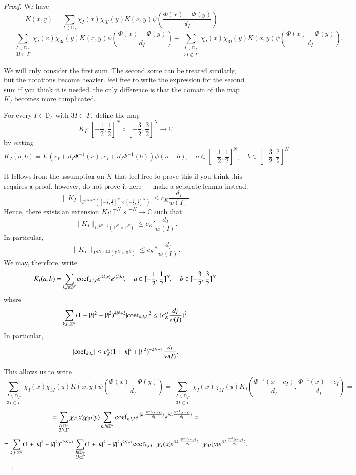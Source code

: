 \documentclass[12pt]{amsart}
\begin{document}
\begin{proof} We have
$$K(x,y)=\sum_{I\in\mathbb{D}_{\Gamma}}\chi_I(x)\chi_{3I}(y)K(x,y)\psi(\frac{\Phi(x)-\Phi(y)}{d_I})=$$
$$=\sum_{\substack{I\in\mathbb{D}_{\Gamma}\\ 3I\subset\Gamma}}\chi_I(x)\chi_{3I}(y)K(x,y)\psi(\frac{\Phi(x)-\Phi(y)}{d_I})+\sum_{\substack{I\in\mathbb{D}_{\Gamma}\\ 3I\not\subset\Gamma}}\chi_I(x)\chi_{3I}(y)K(x,y)\psi(\frac{\Phi(x)-\Phi(y)}{d_I}).$$

We will only consider the first sum. The second some can be treated similarly, but the notations become heavier. {\color{red} feel free to write the expression for the second sum if you think it is needed. the only difference is that the domain of the map $K_I$ becomes more complicated.}

For every $I\in\mathbb{D}_{\Gamma}$ with $3I\subset\Gamma,$ define the map
$$K_I:[-\frac12,\frac12]^N\times[-\frac32,\frac32]^N\to\mathbb{C}$$
by setting
$$K_I(a,b)=K(c_I+d_I\Phi^{-1}(a),c_I+d_I\Phi^{-1}(b))\psi(a-b),\quad a\in[-\frac12,\frac12]^N,\quad b\in[-\frac32,\frac32]^N.$$

It follows from the assumption on $K$ that {\color{red} feel free to prove this if you think this requires a proof. however, do not prove it here --- make a separate lemma instead.}
$$\|K_I\|_{C^{4N+2}([-\frac12,\frac12]^N\times[-\frac32,\frac32]^N)}\leq c_K\frac{d_I}{w(I)}.$$
Hence, there exists an extension $K_I:\mathbb{T}^N\times\mathbb{T}^N\to\mathbb{C}$ such that
$$\|K_I\|_{C^{4N+2}(\mathbb{T}^N\times\mathbb{T}^N)}\leq c_K'\frac{d_I}{w(I)}.$$
In particular,
$$\|K_I\|_{W^{4N+2,2}(\mathbb{T}^N\times\mathbb{T}^N)}\leq c_K''\frac{d_I}{w(I)}.$$
We may, therefore, write
$$K_I(a,b)=\sum_{k,l\in\mathbb{Z}^N}{\rm coef}_{k,l,I}e^{i\langle k,a\rangle}e^{i\langle l,b\rangle},\quad a\in[-\frac12,\frac12]^N,\quad b\in[-\frac32,\frac32]^N,$$
where
$$\sum_{k,l\in\mathbb{Z}^N}(1+|k|^2+|l|^2)^{4N+2}|{\rm coef}_{k,l,I}|^2\leq (c_K''\frac{d_I}{w(I)})^2.$$
In particular,
$$|{\rm coef}_{k,l,I}|\leq c_K''(1+|k|^2+|l|^2)^{-2N-1}\frac{d_I}{w(I)}.$$

This allows us to write
$$\sum_{\substack{I\in\mathbb{D}_{\Gamma}\\ 3I\subset\Gamma}}\chi_I(x)\chi_{3I}(y)K(x,y)\psi(\frac{\Phi(x)-\Phi(y)}{d_I})=\sum_{\substack{I\in\mathbb{D}_{\Gamma}\\ 3I\subset\Gamma}}\chi_I(x)\chi_{3I}(y)K_I(\frac{\Phi^{-1}(x-c_I)}{d_I},\frac{\Phi^{-1}(x)-c_I}{d_I})=$$
$$=\sum_{\substack{I\in\mathbb{D}_{\Gamma}\\ 3I\subset\Gamma}}\chi_I(x)\chi_{3I}(y)\sum_{k,l\in\mathbb{Z}^N}{\rm coef}_{k,l,I}e^{i\langle k,\frac{\Phi^{-1}(x-c_I)}{d_I}\rangle}e^{i\langle l,\frac{\Phi^{-1}(y-c_I)}{d_I}\rangle}=$$
$$=\sum_{k,l\in\mathbb{Z}^N}(1+|k|^2+|l|^2)^{-2N-1}\sum_{\substack{I\in\mathbb{D}_{\Gamma}\\ 3I\subset\Gamma}}(1+|k|^2+|l|^2)^{2N+1}{\rm coef}_{k,l,I}\cdot \chi_I(x)e^{i\langle k,\frac{\Phi^{-1}(x-c_I)}{d_I}\rangle}\cdot \chi_{3I}(y)e^{i\langle l,\frac{\Phi^{-1}(y-c_I)}{d_I}\rangle}.$$


\end{proof}
\end{document}
